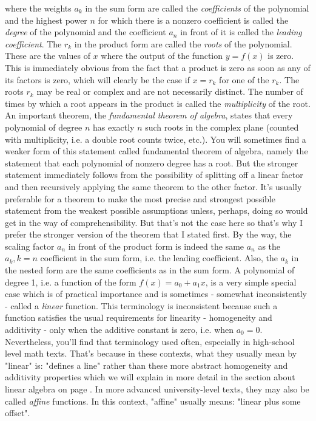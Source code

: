 where the weights $a_k$ in the sum form are called the \emph{coefficients} of the polynomial and the highest power $n$ for which there is a nonzero coefficient is called the \emph{degree} of the polynomial and the coefficient $a_n$ in front of it is called the \emph{leading coefficient}. The $r_k$ in the product form are called the \emph{roots} of the polynomial. These are the values of $x$ where the output of the function $y = f(x)$ is zero. This is immediately obvious from the fact that a product is zero as soon as any of its factors is zero, which will clearly be the case if $x = r_k$ for one of the $r_k$. The roots $r_k$ may be real or complex and are not necessarily distinct. The number of times by which a root appears in the product is called the \emph{multiplicity} of the root. An important theorem, the \emph{fundamental theorem of algebra}, states that every polynomial of degree $n$ has exactly $n$ such roots in the complex plane (counted with multiplicity, i.e. a double root counts twice, etc.). You will sometimes find a weaker form of this statement called fundamental theorem of algebra, namely the statement that each polynomial of nonzero degree has a root. But the stronger statement immediately follows from the possibility of splitting off a linear factor and then recursively applying the same theorem to the other factor. It's usually preferable for a theorem to make the most precise and strongest possible statement from the weakest possible assumptions unless, perhaps, doing so would get in the way of comprehensibility. But that's not the case here so that's why I prefer the stronger version of the theorem that I stated first. By the way, the scaling factor $a_n$ in front of the product form is indeed the same $a_n$ as the $a_k, k=n$ coefficient in the sum form, i.e. the leading coefficient. Also, the $a_k$ in the nested form are the same coefficients as in the sum form. A polynomial of degree 1, i.e. a function of the form $f(x) = a_0 + a_1  x$, is a very simple special case which is of practical importance and is sometimes - somewhat inconsistently - called a \emph{linear} function. This terminology is inconsistent because such a function satisfies the usual requirements for linearity - homogeneity and additivity - only when the additive constant is zero, i.e. when $a_0 = 0$. Nevertheless, you'll find that terminology used often, especially in high-school level math texts. That's because in these contexts, what they usually mean by "linear" is: "defines a line" rather than these more abstract homogeneity and additivity properties which we will explain in more detail in the section about linear algebra on page \pageref{Def:Linearity}. In more advanced university-level texts, they may also be called \emph{affine} functions. In this context, "affine" usually means: "linear plus some offset". 

